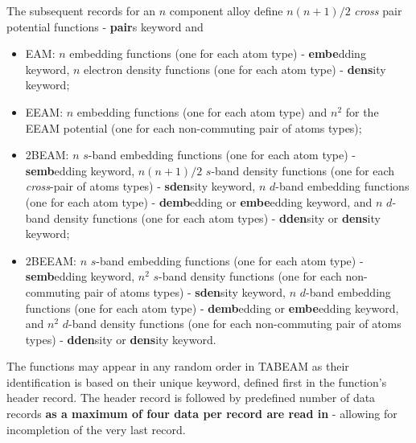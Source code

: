 The subsequent records for an $n$ component alloy define $n(n+1)/2$
{\em cross} pair potential functions - {\bf pair}s keyword and
\begin{itemize}
\item EAM: $n$ embedding functions (one for each atom type) - {\bf embe}dding keyword,
$n$ electron density functions (one for each atom type) - {\bf dens}ity keyword;
\item EEAM: $n$ embedding functions (one for each atom type) and
$n^{2}$ for the EEAM potential (one for each non-commuting pair of atoms types);
\item 2BEAM: $n$ $s$-band embedding functions (one for each atom type)
- {\bf semb}edding keyword,
$n(n+1)/2$ $s$-band density functions (one for each {\em cross}-pair of atoms types)
- {\bf sden}sity keyword,
$n$ $d$-band embedding functions (one for each atom type)
- {\bf demb}edding or {\bf embe}edding keyword, and
$n$ $d$-band density functions (one for each atom types)
- {\bf dden}sity or {\bf dens}ity keyword;
\item 2BEEAM: $n$ $s$-band embedding functions (one for each atom type)
- {\bf semb}edding keyword,
$n^{2}$ $s$-band density functions (one for each non-commuting pair of atoms types)
- {\bf sden}sity keyword,
$n$ $d$-band embedding functions (one for each atom type)
- {\bf demb}edding or {\bf embe}edding keyword, and
$n^{2}$ $d$-band density functions (one for each non-commuting pair of atoms types)
- {\bf dden}sity or {\bf dens}ity keyword.
\end{itemize}

The functions may appear in any random order in TABEAM as their identification
is based on their unique keyword, defined first in the function's header record.
The header record is followed by predefined number of data records {\bf as a maximum
of four data per record are read in} - allowing for incompletion of the very last record.

